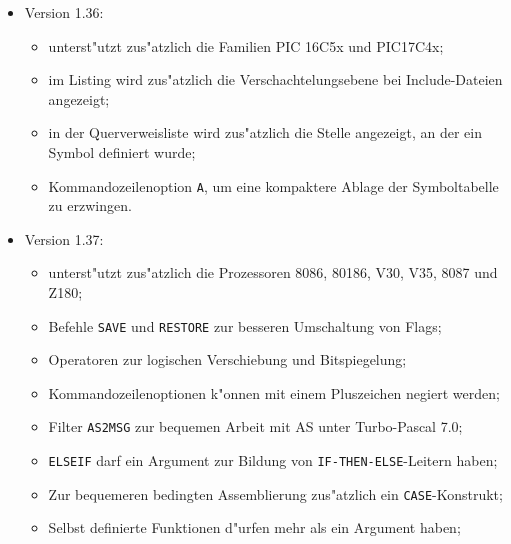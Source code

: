 \documentclass[12pt,a4paper,twoside]{report}
\newcommand{\tty}[1]{{\tt #1}}
\newcommand{\asname}{AS}
\begin{document}
\begin{itemize}
{\begin{itemize}
      \item{Kommandozeilenoption \tty{D}, um Symbole von au"sen definieren zu
            k"onnen;}
      \item{Fragt die Environment-Variable \tty{ASCMD} f"ur h"aufig gebrauchte
            Optionen ab;}
      \item{bei gesetzter \tty{u}-Option wird das Programm zus"atzlich auf doppelt
            belegte Speicherbereiche abgepr"uft;}
      \item{Kommandozeilenoption \tty{C}, um eine Querverweisliste zu erzeugen.}
      \end{itemize}}
\item{Version 1.36:
      \begin{itemize}
      \item{unterst"utzt zus"atzlich die Familien PIC 16C5x und
            PIC17C4x;}
      \item{im Listing wird zus"atzlich die Verschachtelungsebene bei
            Include-Dateien angezeigt;}
      \item{in der Querverweisliste wird zus"atzlich die Stelle angezeigt,
            an der ein Symbol definiert wurde;}
      \item{Kommandozeilenoption \tty{A}, um eine kompaktere Ablage der
            Symboltabelle zu erzwingen.}
      \end{itemize}}
\item{Version 1.37:
      \begin{itemize}
      \item{unterst"utzt zus"atzlich die Prozessoren 8086, 80186, V30,
            V35, 8087 und Z180;}
      \item{Befehle \tty{SAVE} und \tty{RESTORE} zur besseren Umschaltung
            von Flags;}
      \item{Operatoren zur logischen Verschiebung und Bitspiegelung;}
      \item{Kommandozeilenoptionen k"onnen mit einem Pluszeichen negiert
            werden;}
      \item{Filter \tty{AS2MSG} zur bequemen Arbeit mit \asname{} unter Turbo-Pascal 7.0;}
      \item{\tty{ELSEIF} darf ein Argument zur Bildung von
            \tty{IF-THEN-ELSE}-Leitern haben;}
      \item{Zur bequemeren bedingten Assemblierung zus"atzlich ein
            \tty{CASE}-Konstrukt;}
      \item{Selbst definierte Funktionen d"urfen mehr als ein Argument haben;}

\end{itemize}}
\end{itemize}
\end{document}
